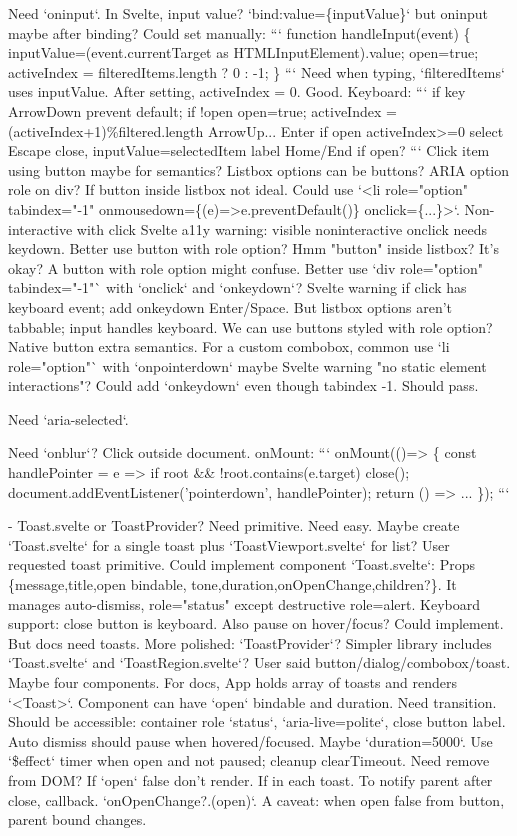 \begin{decodedreasoningpanel}
Need `oninput`. In Svelte, input value? `bind:value=\{inputValue\}` but oninput maybe after binding? Could set manually:
```
function handleInput(event) \{
 inputValue=(event.currentTarget as HTMLInputElement).value;
 open=true; activeIndex = filteredItems.length ? 0 : -1;
\}
```
Need when typing, `filteredItems` uses inputValue. After setting, activeIndex = 0. Good.
Keyboard:
```
if key ArrowDown prevent default; if !open open=true; activeIndex = (activeIndex+1)\%filtered.length
ArrowUp...
Enter if open activeIndex>=0 select
Escape close, inputValue=selectedItem label
Home/End if open?
```
Click item using button maybe for semantics? Listbox options can be buttons? ARIA option role on div? If button inside listbox not ideal. Could use `<li role="option" tabindex="-1" onmousedown=\{(e)=>e.preventDefault()\} onclick=\{...\}>`. Non-interactive with click Svelte a11y warning: visible noninteractive onclick needs keydown. Better use button with role option? Hmm "button" inside listbox? It's okay? A button with role option might confuse. Better use `div role="option" tabindex="-1"` with `onclick` and `onkeydown`? Svelte warning if click has keyboard event; add onkeydown Enter/Space. But listbox options aren't tabbable; input handles keyboard. We can use buttons styled with role option? Native button extra semantics. For a custom combobox, common use `li role="option"` with `onpointerdown` maybe Svelte warning "no static element interactions"? Could add `onkeydown` even though tabindex -1. Should pass.

Need `aria-selected`.

Need `onblur`? Click outside document. onMount:
```
onMount(()=> \{
 const handlePointer = e => if root \&\& !root.contains(e.target) close();
 document.addEventListener('pointerdown', handlePointer);
 return () => ...
\});
```

- Toast.svelte or ToastProvider? Need primitive. Need easy. Maybe create `Toast.svelte` for a single toast plus `ToastViewport.svelte` for list? User requested toast primitive. Could implement component `Toast.svelte`: Props \{message,title,open bindable, tone,duration,onOpenChange,children?\}. It manages auto-dismiss, role="status" except destructive role=alert. Keyboard support: close button is keyboard. Also pause on hover/focus? Could implement. But docs need toasts. More polished: `ToastProvider`? Simpler library includes `Toast.svelte` and `ToastRegion.svelte`? User said button/dialog/combobox/toast. Maybe four components. For docs, App holds array of toasts and renders `<Toast>`. Component can have `open` bindable and duration. Need transition. Should be accessible: container role `status`, `aria-live=polite`, close button label. Auto dismiss should pause when hovered/focused. Maybe `duration=5000`. Use `\$effect` timer when open and not paused; cleanup clearTimeout. Need remove from DOM? If `open` false don't render. If in each toast. To notify parent after close, callback. `onOpenChange?.(open)`. A caveat: when open false from button, parent bound changes.


\end{decodedreasoningpanel}
